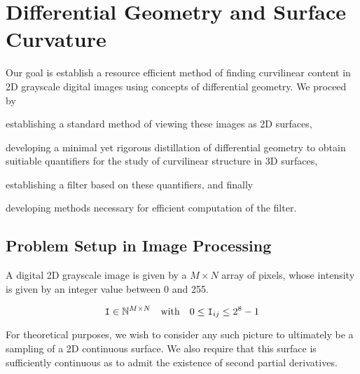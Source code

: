 \chapter{Differential Geometry and Surface Curvature} \label{ch:diffgeo}


Our goal is establish a resource efficient method of finding curvilinear content in 2D grayscale digital images using concepts of differential geometry. We proceed by
\begin{enumerate*}[label=(\roman*)]
	\item establishing a standard method of viewing these images as 2D surfaces,
	\item developing a minimal yet rigorous distillation of differential geometry
			to obtain suitiable quantifiers
			for the study of curvilinear structure in 3D surfaces,
	\item establishing a filter based on these quantifiers,
	and finally
	\item developing methods necessary for efficient computation of the filter.
\end{enumerate*}


\section{Problem Setup in Image Processing}\label{sec:image-processing-setup}

A digital 2D grayscale image is given by a $M\times N$ array of pixels, whose intensity is given by an integer value between 0 and 255.

\begin{defn} \label{def:image_as_pixel_matrix}
	\begin{equation*}
	\mathtt{I} \in \mathbb{N}^{M \times N}
	\quad\textrm{with}\quad
	0 \le \mathtt{I}_{ij} \le 2^8 - 1
	\end{equation*}
\end{defn}
	For theoretical purposes, we wish to consider any such picture to ultimately be a sampling of a 2D continuous surface. We also require that this surface is sufficiently continuous as to admit the existence of second partial derivatives.
	
